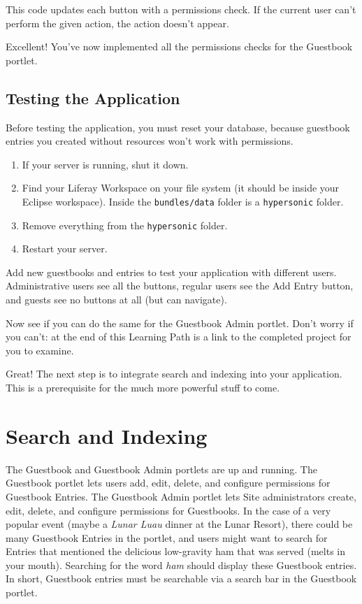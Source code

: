 This code updates each button with a permissions check. If the current
user can't perform the given action, the action doesn't appear.

Excellent! You've now implemented all the permissions checks for the
Guestbook portlet.

\section{Testing the Application}\label{testing-the-application}

Before testing the application, you must reset your database, because
guestbook entries you created without resources won't work with
permissions.

\begin{enumerate}
\def\labelenumi{\arabic{enumi}.}
\item
  If your server is running, shut it down.
\item
  Find your Liferay Workspace on your file system (it should be inside
  your Eclipse workspace). Inside the \texttt{bundles/data} folder is a
  \texttt{hypersonic} folder.
\item
  Remove everything from the \texttt{hypersonic} folder.
\item
  Restart your server.
\end{enumerate}

Add new guestbooks and entries to test your application with different
users. Administrative users see all the buttons, regular users see the
Add Entry button, and guests see no buttons at all (but can navigate).

Now see if you can do the same for the Guestbook Admin portlet. Don't
worry if you can't: at the end of this Learning Path is a link to the
completed project for you to examine.

Great! The next step is to integrate search and indexing into your
application. This is a prerequisite for the much more powerful stuff to
come.

\chapter{Search and Indexing}\label{search-and-indexing}

The Guestbook and Guestbook Admin portlets are up and running. The
Guestbook portlet lets users add, edit, delete, and configure
permissions for Guestbook Entries. The Guestbook Admin portlet lets Site
administrators create, edit, delete, and configure permissions for
Guestbooks. In the case of a very popular event (maybe a \emph{Lunar
Luau} dinner at the Lunar Resort), there could be many Guestbook Entries
in the portlet, and users might want to search for Entries that
mentioned the delicious low-gravity ham that was served (melts in your
mouth). Searching for the word \emph{ham} should display these Guestbook
entries. In short, Guestbook entries must be searchable via a search bar
in the Guestbook portlet.

